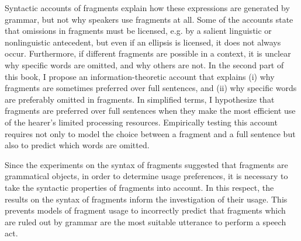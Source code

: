Syntactic accounts of fragments explain how these expressions are generated by grammar, but not why speakers use fragments at all. Some of the accounts state that omissions in fragments must be licensed, e.g. by a salient linguistic \citep{merchant2004, reich2007} or nonlinguistic \citep{stainton2006} antecedent, but even if an ellipsis is licensed, it does not always occur. Furthermore, if different fragments are possible in a context, it is unclear why specific words are omitted, and why others are not. In the second part of this book, I propose an information-theoretic account that explains (i) why fragments are sometimes preferred over full sentences, and (ii) why specific words are preferably omitted in fragments. In simplified terms, I hypothesize that fragments are preferred over full sentences when they make the most efficient use of the hearer's limited processing resources. Empirically testing this account requires not only to model the choice between a fragment and a full sentence but also to predict which words are omitted. %

\newpage
\noindent Since the experiments on the syntax of fragments suggested that fragments are grammatical objects, in order to determine usage preferences, it is necessary to take the syntactic properties of fragments into account. In this respect, the results on the syntax of fragments inform the investigation of their usage. This prevents models of fragment usage to incorrectly predict that fragments which are ruled out by grammar are the most suitable utterance to perform a speech act.